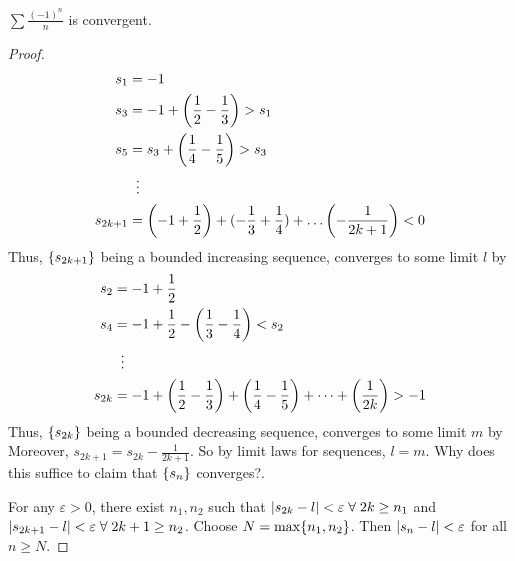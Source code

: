 \begin{example}
    $\sum \frac{(-1)^{n}}{n}$ is convergent.
\end{example}
\begin{proof}
    \begin{align*}
        s_{1} &= -1 \\
        s_{3} &= -1 + \paren{\frac{1}{2} - \frac{1}{3}} > s_{1} \\
        s_{5} &= s_{3} + \paren{\frac{1}{4} - \frac{1}{5}} > s_{3} \\
        &\;\;\vdots \\
        s_{2k+1} &= \paren{-1 + \frac{1}{2}} + (-\frac{1}{3} + \frac{1}{4}) + \dots \paren{-\frac{1}{2k+1}} < 0
    \end{align*}
    Thus, $\set{s_{2k+1}}$ being a bounded increasing sequence, converges to some limit $l$ by 
    \begin{align*}
        s_{2} &= -1 + \frac{1}{2} \\
        s_{4} &= -1 + \frac{1}{2} - \paren{\frac{1}{3} - \frac{1}{4}} < s_{2} \\
        &\;\;\vdots \\
        s_{2k} &= -1 + \paren{\frac{1}{2} - \frac{1}{3}} + \paren{\frac{1}{4} - \frac{1}{5}} + \dots + \paren{\frac{1}{2k}} > -1
    \end{align*}
    Thus, $\set{s_{2k}}$ being a bounded decreasing sequence, converges to some limit $m$ by 
    Moreover, $s_{2k+1} = s_{2k} - \frac{1}{2k + 1}$.
    So by limit laws for sequences, $l = m$.
    \textcolor{exercise}{Why does this suffice to claim that $\set{s_{n}}$ converges?}.

    \textcolor{solved}{For any $\varepsilon > 0$,} there exist $n_{1}, n_{2}$ such that $\abs{s_{2k} - l} < \varepsilon \;\forall\; 2k \geq n_{1}$ and $\abs{s_{2k+1} - l} < \varepsilon \;\forall\; 2k + 1 \geq  n_{2}$.
    Choose $N = \max \set{n_{1}, n_{2}}$.
    Then $\abs{s_{n} - l} < \varepsilon$ for all $n \geq  N$.
\end{proof}

